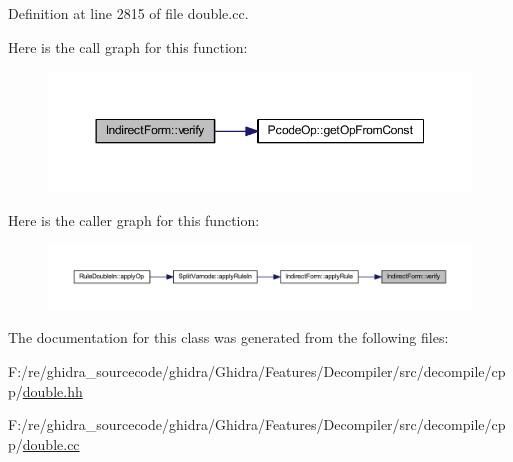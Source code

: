 Definition at line 2815 of file double.\+cc.

Here is the call graph for this function\+:
\nopagebreak
\begin{figure}[H]
\begin{center}
\leavevmode
\includegraphics[width=350pt]{class_indirect_form_a4a8c810890cca97f193fc9a3a720f0fc_cgraph}
\end{center}
\end{figure}
Here is the caller graph for this function\+:
\nopagebreak
\begin{figure}[H]
\begin{center}
\leavevmode
\includegraphics[width=350pt]{class_indirect_form_a4a8c810890cca97f193fc9a3a720f0fc_icgraph}
\end{center}
\end{figure}


The documentation for this class was generated from the following files\+:\begin{DoxyCompactItemize}
\item 
F\+:/re/ghidra\+\_\+sourcecode/ghidra/\+Ghidra/\+Features/\+Decompiler/src/decompile/cpp/\mbox{\hyperlink{double_8hh}{double.\+hh}}\item 
F\+:/re/ghidra\+\_\+sourcecode/ghidra/\+Ghidra/\+Features/\+Decompiler/src/decompile/cpp/\mbox{\hyperlink{double_8cc}{double.\+cc}}\end{DoxyCompactItemize}
